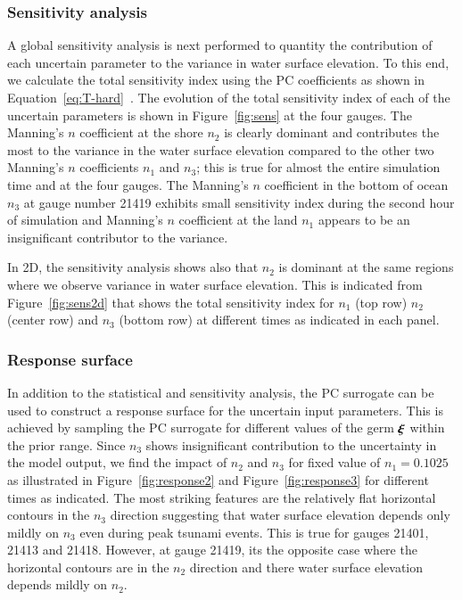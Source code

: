 \subsubsection{Sensitivity analysis}
A global sensitivity analysis is next performed to quantity the contribution of each
uncertain parameter to the variance in water surface elevation. To this end, we calculate 
the total sensitivity index using the PC coefficients as shown in Equation~\eqref{eq:T-hard}~\citep{Alexanderian2012,Sudret,Crestaux}. The evolution of the total sensitivity index
of each of the uncertain parameters is shown in Figure~\ref{fig:sens} at the four gauges. 
The Manning's $n$ coefficient at the shore $n_2$ is clearly dominant and contributes
the most to the variance in the water surface elevation compared to the other two 
Manning's $n$ coefficients $n_1$ and $n_3$; this is true for almost the entire simulation time
and at the four gauges. The Manning's $n$ coefficient
in the bottom of ocean $n_{3}$ at gauge number 21419 exhibits small sensitivity index 
during the second hour of simulation and Manning's $n$ coefficient
at the land $n_1$ appears to be an insignificant contributor
to the variance.

In 2D, the sensitivity analysis shows also that $n_2$ is dominant
at the same regions where we observe variance in water surface elevation. This is
indicated from Figure~\ref{fig:sens2d} that shows the total sensitivity index
for $n_1$ (top row) $n_2$ (center row) and $n_3$ (bottom row)
at different times as indicated in each panel.

\subsubsection{Response surface}
In addition to the statistical and sensitivity analysis, the PC surrogate 
can be used to construct a response surface for the uncertain input parameters.
This is achieved by sampling the PC surrogate for different values of the germ $\xxi$ within the prior
range. Since $n_3$ shows insignificant contribution to the 
uncertainty in the model output, we find the impact of $n_2$ and $n_3$ for 
fixed value of $n_1=0.1025$ as illustrated in Figure~\ref{fig:response2}
and Figure~\ref{fig:response3} for different times as indicated. The most striking features are the relatively flat
horizontal contours in the $n_3$ direction suggesting that water surface elevation depends
only mildly on $n_3$ even during peak tsunami events. This is true for gauges 21401, 21413 and 21418. However,
at gauge 21419, its the opposite case where the horizontal contours are in the $n_2 $ direction
and there water surface elevation depends mildly on $n_2$.
